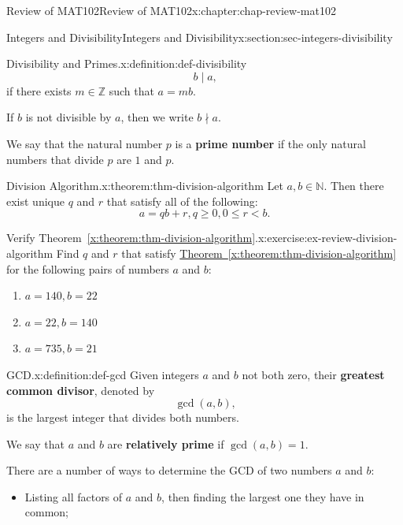\documentclass[oneside,10pt,]{book}
\newcommand{\xreffont}{\relax}
\newcommand{\terminology}[1]{\textbf{#1}}
\numberwithin{equation}{section}
\newcommand{\lt}{<}
\begin{document}
\begin{chapterptx}{Review of MAT102}{}{Review of MAT102}{}{}{x:chapter:chap-review-mat102}
\begin{sectionptx}{Integers and Divisibility}{}{Integers and Divisibility}{}{}{x:section:sec-integers-divisibility}
\begin{definition}{Divisibility and Primes.}{x:definition:def-divisibility}
\begin{equation*}
b \mid a\text{,}
\end{equation*}
if there exists \(m \in \mathbb{Z}\) such that \(a = mb\).%
\par
If \(b\) is not divisible by \(a\), then we write \(b \nmid a\).%
\par
We say that the natural number \(p\) is a \terminology{prime number} if the only natural numbers that divide \(p\) are \(1\) and \(p\).%
\end{definition}
\begin{theorem}{Division Algorithm.}{}{x:theorem:thm-division-algorithm}%
Let \(a,b \in \mathbb{N}\). Then there exist unique \(q\) and \(r\) that satisfy all of the following:%
\begin{equation*}
a = qb + r, q \geq 0, 0 \leq r \lt b\text{.}
\end{equation*}
%
\end{theorem}
\begin{inlineexercise}{Verify Theorem~{\xreffont\ref*{x:theorem:thm-division-algorithm}}.}{x:exercise:ex-review-division-algorithm}%
Find \(q\) and \(r\) that satisfy \hyperref[x:theorem:thm-division-algorithm]{Theorem~{\xreffont\ref{x:theorem:thm-division-algorithm}}} for the following pairs of numbers \(a\) and \(b\):%
\begin{enumerate}[label=(\alph*)]
\item{}\(\displaystyle a = 140, b = 22\)%
\item{}\(\displaystyle a = 22, b = 140\)%
\item{}\(\displaystyle a = 735, b = 21\)%
\end{enumerate}
%
\end{inlineexercise}
\begin{definition}{GCD.}{x:definition:def-gcd}%
\label{g:notation:id463621} Given integers \(a\) and \(b\) not both zero, their \terminology{greatest common divisor}, denoted by%
\begin{equation*}
\gcd(a,b)\text{,}
\end{equation*}
is the largest integer that divides both numbers.%
\par
We say that \(a\) and \(b\) are \terminology{relatively prime} if \(\gcd(a,b) = 1\).%
\end{definition}
There are a number of ways to determine the GCD of two numbers \(a\) and \(b\):%
\begin{itemize}[label=\textbullet]
\item{}Listing all factors of \(a\) and \(b\), then finding the largest one they have in common;%

\end{itemize}
\end{sectionptx}
\end{chapterptx}
\end{document}
